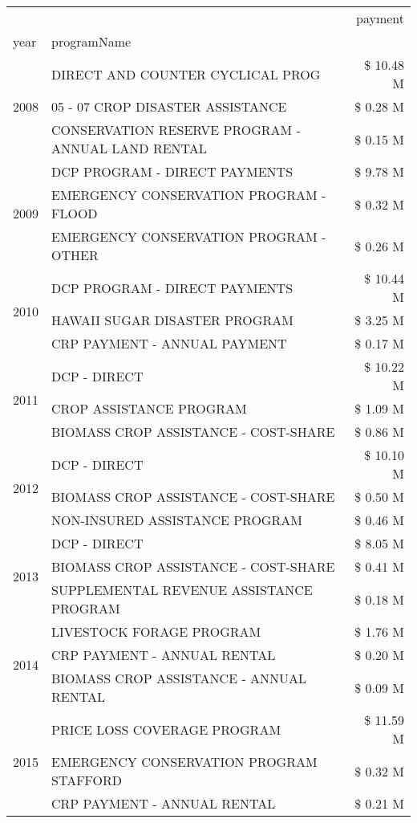 \begin{tabular}{llr}
\toprule
 &  & payment \\
year & programName &  \\
\midrule
\multirow[t]{3}{*}{2008} & DIRECT AND COUNTER CYCLICAL PROG & \$ 10.48 M \\
 & 05 - 07 CROP DISASTER ASSISTANCE & \$ 0.28 M \\
 & CONSERVATION RESERVE PROGRAM - ANNUAL LAND RENTAL & \$ 0.15 M \\
\cline{1-3}
\multirow[t]{3}{*}{2009} & DCP PROGRAM - DIRECT PAYMENTS & \$ 9.78 M \\
 & EMERGENCY CONSERVATION PROGRAM - FLOOD & \$ 0.32 M \\
 & EMERGENCY CONSERVATION PROGRAM - OTHER & \$ 0.26 M \\
\cline{1-3}
\multirow[t]{3}{*}{2010} & DCP PROGRAM - DIRECT PAYMENTS & \$ 10.44 M \\
 & HAWAII SUGAR DISASTER PROGRAM & \$ 3.25 M \\
 & CRP PAYMENT - ANNUAL PAYMENT & \$ 0.17 M \\
\cline{1-3}
\multirow[t]{3}{*}{2011} & DCP - DIRECT & \$ 10.22 M \\
 & CROP ASSISTANCE PROGRAM & \$ 1.09 M \\
 & BIOMASS CROP ASSISTANCE - COST-SHARE & \$ 0.86 M \\
\cline{1-3}
\multirow[t]{3}{*}{2012} & DCP - DIRECT & \$ 10.10 M \\
 & BIOMASS CROP ASSISTANCE - COST-SHARE & \$ 0.50 M \\
 & NON-INSURED ASSISTANCE PROGRAM & \$ 0.46 M \\
\cline{1-3}
\multirow[t]{3}{*}{2013} & DCP - DIRECT & \$ 8.05 M \\
 & BIOMASS CROP ASSISTANCE - COST-SHARE & \$ 0.41 M \\
 & SUPPLEMENTAL REVENUE ASSISTANCE PROGRAM & \$ 0.18 M \\
\cline{1-3}
\multirow[t]{3}{*}{2014} & LIVESTOCK FORAGE PROGRAM & \$ 1.76 M \\
 & CRP PAYMENT - ANNUAL RENTAL & \$ 0.20 M \\
 & BIOMASS CROP ASSISTANCE - ANNUAL RENTAL & \$ 0.09 M \\
\cline{1-3}
\multirow[t]{3}{*}{2015} & PRICE LOSS COVERAGE PROGRAM & \$ 11.59 M \\
 & EMERGENCY CONSERVATION PROGRAM STAFFORD & \$ 0.32 M \\
 & CRP PAYMENT - ANNUAL RENTAL & \$ 0.21 M \\

\end{tabular}
